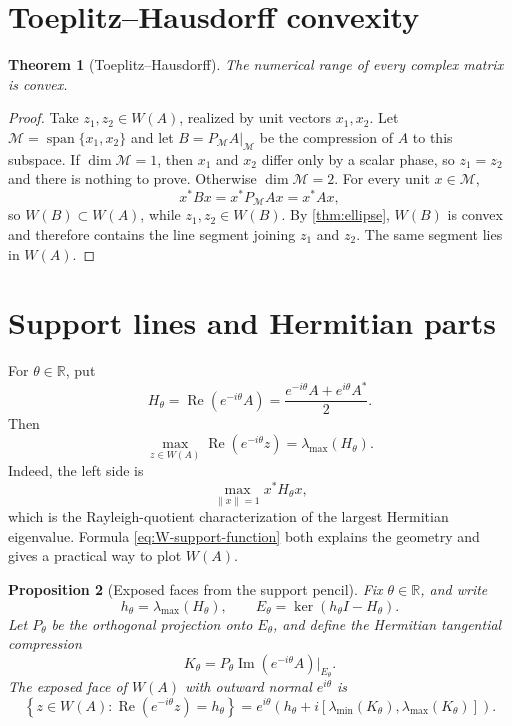 \documentclass[11pt,oneside,openany]{book}
\newtheorem{theorem}{Theorem}[chapter]
\newtheorem{proposition}[theorem]{Proposition}
\theoremstyle{definition}
\theoremstyle{remark}
\newcommand{\R}{\mathbb R}
\newcommand{\RePart}{\operatorname{Re}}
\newcommand{\ImPart}{\operatorname{Im}}
\newcommand{\Span}{\operatorname{span}}
\newcommand{\norm}[1]{\left\lVert #1\right\rVert}
\newcommand{\set}[1]{\left\{#1\right\}}
\begin{document}
\section{Toeplitz--Hausdorff convexity}

\begin{theorem}[Toeplitz--Hausdorff]
\label{thm:toeplitz-hausdorff}
The numerical range of every complex matrix is convex.
\end{theorem}

\begin{proof}
Take \(z_1,z_2\in W(A)\), realized by unit vectors \(x_1,x_2\).
Let \(\mathcal M=\Span\{x_1,x_2\}\) and let
\(B=P_{\mathcal M}A|_{\mathcal M}\) be the compression of \(A\) to
this subspace.  If \(\dim\mathcal M=1\), then \(x_1\) and \(x_2\)
differ only by a scalar phase, so \(z_1=z_2\) and there is nothing to
prove.  Otherwise \(\dim\mathcal M=2\).  For every unit
\(x\in\mathcal M\),
\[
  x^*Bx=x^*P_{\mathcal M}Ax=x^*Ax,
\]
so \(W(B)\subset W(A)\), while \(z_1,z_2\in W(B)\).
By \cref{thm:ellipse}, \(W(B)\) is convex and therefore contains the
line segment joining \(z_1\) and \(z_2\).  The same segment lies in
\(W(A)\).
\end{proof}

\section{Support lines and Hermitian parts}

For \(\theta\in\R\), put
\[
  H_\theta=\RePart(e^{-i\theta}A)
  =\frac{e^{-i\theta}A+e^{i\theta}A^*}{2}.
\]
Then
\begin{equation}
  \max_{z\in W(A)}\RePart(e^{-i\theta}z)
  =\lambda_{\max}(H_\theta).
  \label{eq:W-support-function}
\end{equation}
Indeed, the left side is
\[
  \max_{\norm{x}=1}x^*H_\theta x,
\]
which is the Rayleigh-quotient characterization of the largest
Hermitian eigenvalue.  Formula \eqref{eq:W-support-function} both
explains the geometry and gives a practical way to plot \(W(A)\).

\begin{proposition}[Exposed faces from the support pencil]
\label{prop:exposed-face-pencil}
Fix \(\theta\in\R\), and write
\[
  h_\theta=\lambda_{\max}(H_\theta),
  \qquad
  E_\theta=\ker(h_\theta I-H_\theta).
\]
Let \(P_\theta\) be the orthogonal projection onto \(E_\theta\), and
define the Hermitian tangential compression
\[
  K_\theta
  =
  P_\theta\ImPart(e^{-i\theta}A)|_{E_\theta}.
\]
The exposed face of \(W(A)\) with outward normal \(e^{i\theta}\) is
\begin{equation}
  \set{z\in W(A):\RePart(e^{-i\theta}z)=h_\theta}
  =
  e^{i\theta}
  \left(
    h_\theta+
    i[\lambda_{\min}(K_\theta),\lambda_{\max}(K_\theta)]
  \right).
  \label{eq:exposed-face-pencil}
\end{equation}
\end{proposition}
\end{document}
